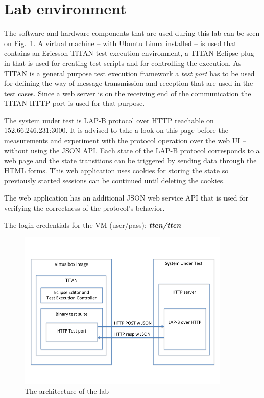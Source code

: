 \documentclass[a4paper]{article}
\begin{document}
\section{Lab environment}

The software and hardware components that are used during this lab can be seen on Fig.~\ref{fig:lab-arch}.
A virtual machine -- with Ubuntu Linux installed -- is used that contains an Ericsson TITAN test execution environment,
a TITAN Eclipse plug-in that is used for creating test scripts and for controlling the execution. As TITAN is a general
purpose test execution framework a \emph{test port} has to be used for defining the way of message transmission and
reception that are used in the test cases. Since a web server is on the receiving end of the communication the TITAN
HTTP port is used for that purpose.

The system under test is LAP-B protocol over HTTP reachable on \url{152.66.246.231:3000}. It is advised to take a look
on this page before the measurements and experiment with the protocol operation over the web UI -- without using the
JSON API.
Each state of the LAP-B protocol corresponds to a web page and the state transitions can be triggered by sending data
through the HTML forms.
This web application uses cookies for storing the state so previously started sessions can be continued until deleting
the cookies.

The web application has an additional JSON web service API that is used for verifying the correctness of the protocol's
behavior.

The login credentials for the VM (user/pass): \textbf{\emph{ttcn/ttcn}}

\begin{figure}[!htb]
    \centering
    \includegraphics[width=0.9\textwidth]{figures/lab-arch.png}
    \caption{The architecture of the lab}
    \label{fig:lab-arch}
\end{figure}
\end{document}
